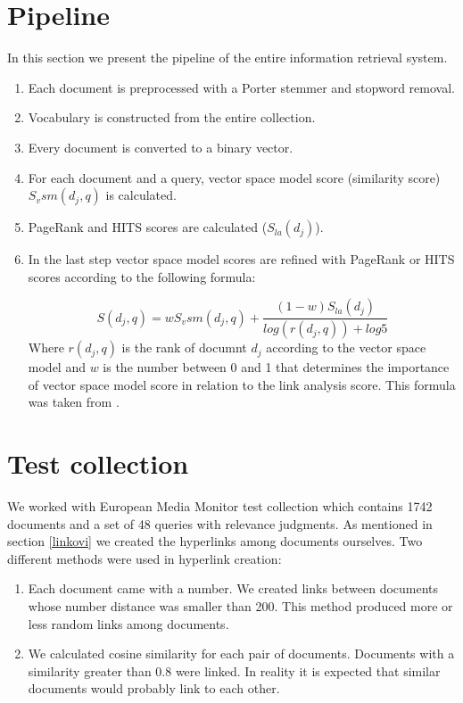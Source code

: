\documentclass[10pt, a4paper]{article}
\begin{document}
\section{Pipeline}
In this section we present the pipeline of the entire information retrieval system.

\begin{enumerate}
\item Each document is preprocessed with a Porter stemmer and stopword removal.
\item Vocabulary is constructed from the entire collection.
\item Every document is converted to a binary vector.
\item For each document and a query, vector space model score (similarity score) $S_vsm(d_j, q)$ is calculated.
\item PageRank and HITS scores are calculated ($S_{la}(d_j)$).
\item In the last step vector space model scores are refined with PageRank or HITS scores according to the following formula:

\begin{equation}
  S(d_j, q) = wS_vsm(d_j, q) + \frac{(1-w)S_{la}(d_j)}{log(r(d_j, q)) + log5}
\end{equation}
Where  $r(d_j, q)$ is the rank of documnt $d_j$ according to the vector space model and $w$ is the number between 0 and 1 that determines the importance of vector space model score in relation to the link analysis score. This formula was taken from \citep{kinez}.

\end{enumerate}
\section{Test collection}
We worked with European Media Monitor test collection which contains 1742 documents and a set of 48 queries with relevance judgments. As mentioned in section \ref{linkovi} we created the hyperlinks among documents ourselves. Two different methods were used in hyperlink creation:
\begin{enumerate}
\item Each document came with a number. We created links between documents whose number distance was smaller than 200. This method produced more or less random links among documents.
\item We calculated cosine similarity for each pair of documents. Documents with a similarity greater than 0.8 were linked. In reality it is expected that similar documents would probably link to each other.
\end{enumerate}
\end{document}
